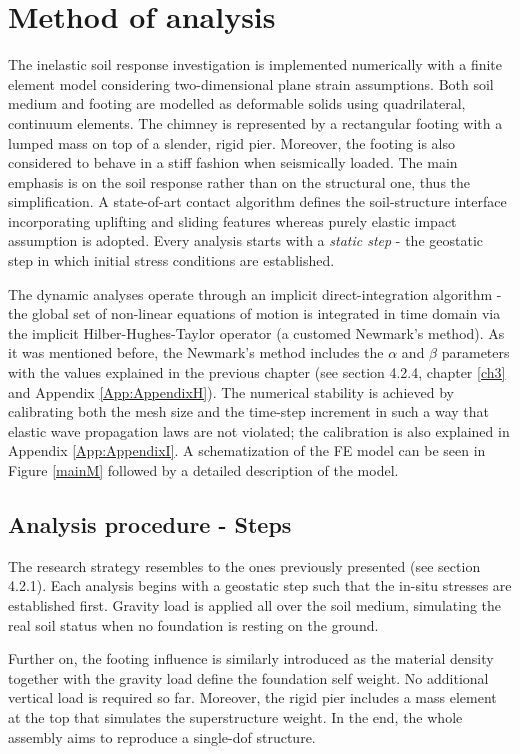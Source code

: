 	
\section{Method of analysis}
The inelastic soil response investigation is implemented numerically with a finite element model considering two-dimensional plane strain assumptions. Both soil medium and \mbox{footing} are modelled as deformable solids using quadrilateral, continuum elements. The chimney is represented by a rectangular footing with a lumped mass on top of a slender, rigid pier. Moreover, the footing is also considered to behave in a stiff fashion when seismically loaded. The main emphasis is on the soil response rather than on the structural one, thus the simplification. A state-of-art contact algorithm defines the soil-structure interface incorporating uplifting and sliding features whereas purely elastic impact assumption is adopted. Every analysis starts with a \textit{static step} - the geostatic step in which initial stress conditions are established.  

The dynamic analyses operate through an implicit direct-integration algorithm - the global set of non-linear equations of motion is integrated in time domain via the implicit Hilber-Hughes-Taylor operator (a customed Newmark's method). As it was mentioned before, the Newmark's method includes the $\alpha$ and $\beta$ parameters with the values explained in the previous chapter (see section 4.2.4, chapter \ref{ch3} and Appendix \ref{App:AppendixH}). The numerical stability is achieved by calibrating both the mesh size and the time-step increment in such a way that elastic wave propagation laws are not violated; the calibration is also explained in Appendix \ref{App:AppendixI}. A schematization of the FE model can be seen in Figure \ref{mainM} followed by a detailed description of the model.

\subsection{Analysis procedure - Steps}
The research strategy resembles to the ones previously presented (see section 4.2.1). Each analysis begins with a geostatic step such that the in-situ stresses are established first. Gravity load is applied all over the soil medium, simulating the real soil status when no foundation is resting on the ground.

Further on, the footing influence is similarly introduced as the material density together with the gravity load define the foundation self weight. No additional vertical load is required so far. Moreover, the rigid pier includes a mass element at the top that simulates the superstructure weight. In the end, the whole assembly aims to reproduce a single-dof structure.

